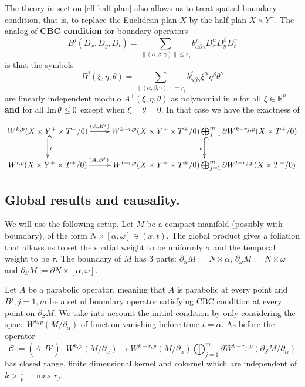 The theory in section \ref{ell-half-plan} also allows us to treat spatial boundary
condition, that is, to replace the Euclidean plan \(X\) by the half-plan \(X\times Y^+\). The analog of \textbf{CBC condition} for boundary operators
\[
 B^j(D_x,D_y,D_t) = \sum_{\|(\alpha,\beta,\gamma)\|\leq r_j} b_{\alpha\beta\gamma}^j
D_x^\alpha D_y^\beta D_t^\gamma
\]
is that the symbols
\[
B^j(\xi,\eta,\theta) = \sum_{\|(\alpha,\beta,\gamma)\|= r_j} b_{\alpha\beta\gamma}^j
\xi^\alpha \eta^\beta \theta^\gamma
\]
are linearly independent modulo \(A^+(\xi,\eta,\theta)\) as polynomial in \(\eta\) for
all \(\xi\in \mathbb{R}^n\) \textbf{and} for all \(\mathop{\rm Im}\nolimits\theta \leq 0\) except when \(\xi=\theta= 0\). In that case we have the exactness of
\[
\xymatrix{
W^{k,p}(X\times Y^+\times T^+/0) \ar@{->}[r]^<<<<<{(A,B^j)} \ar@{^{(}->}[d]^{\iota} & W^{k-r,p}(X\times Y^+\times T^+/0)\bigoplus_{j=1}^m \partial W^{k-r_j,p}(X\times T^+/0) \ar@{^{(}->}[d]_{\iota} \\
W^{l,p}(X\times Y^+\times T^+/0) \ar@{->}[r]^<<<<<{(A,B^j)} & W^{l-r,p}(X\times Y^+\times T^+/0)\bigoplus_{j=1}^m\partial W^{l-r_j,p}(X\times T^+/0)
}
\]


\subsection{Global results and causality. \label{sec:global-result-para}}
\label{sec:org33fecf2}

We will use the following setup. Let \(M\) be a compact manifold (possibly with boundary), of the form \(N\times
[\alpha,\omega]\ni (x,t)\). The global product gives a foliation that allows us to set the
spatial weight to be uniformly \(\sigma\) and the temporal weight to be \(\tau\). The
boundary of \(M\) has 3 parts: \(\partial_\alpha M := N\times \alpha\), \(\partial_\omega M := N\times\omega\) and \(\partial_S M := \partial N\times [\alpha,\omega]\).

Let \(A\) be a parabolic operator, meaning that \(A\) is parabolic at every point and
\(B^j, j=\overline{1,m}\) be a set of boundary operator satisfying CBC condition at
every point on \(\partial_S M\). We take into account the initial condition by only
considering the space \(W^{k,p}(M/\partial_\alpha)\) of function vanishing before time \(t=\alpha\). As before the operator
\[
 \mathcal{C}:=(A,B^j):\  W^{k,p}(M/ \partial_\alpha) \longrightarrow W^{k-r,p}(M/
\partial_\alpha)\bigoplus_{j=1}^m \partial W^{k-r_j,p}(\partial_S M/ \partial_\alpha)
\]
has closed range, finite dimensional kernel and cokernel which are independent of \(k >
\frac{1}{p}+\max r_j\).

